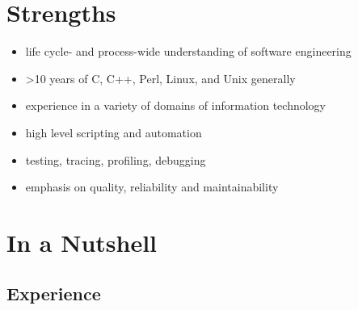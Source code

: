 \documentclass[a4paper,12pt]{article}
\newcommand{\compress}{\setlength\itemsep{-\parskip}}
\begin{document}
\section{Strengths}

\begin{itemize}\compress
\item	life cycle- and process-wide understanding of software engineering
\item	>10 years of C, C++, Perl, Linux, and Unix generally
\item	experience in a variety of domains of information technology
\item	high level scripting and automation
\item	testing, tracing, profiling, debugging
\item	emphasis on quality, reliability and maintainability
\end{itemize}

\section{In a Nutshell}

\subsection*{Experience}
\end{document}
